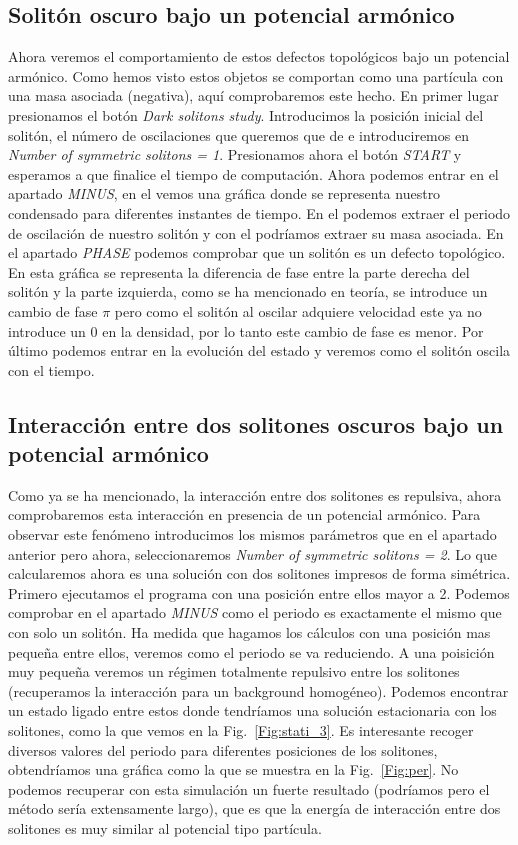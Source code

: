 \documentclass[12pt]{article}
\begin{document}
\subsection{Solit\'on oscuro bajo un potencial arm\'onico}
Ahora veremos el comportamiento de estos defectos topol\'ogicos bajo un potencial arm\'onico. Como hemos visto estos objetos se comportan como una part\'icula con una masa asociada (negativa), aqu\'i comprobaremos este hecho. En primer lugar presionamos el bot\'on \textit{Dark solitons study}. Introducimos la posici\'on inicial del solit\'on, el n\'umero de oscilaciones que queremos que de e introduciremos en \textit{Number of symmetric solitons = 1}. Presionamos ahora el bot\'on \textit{START} y esperamos a que finalice el tiempo de computaci\'on. Ahora podemos entrar en el apartado \textit{MINUS}, en el vemos una gr\'afica donde se representa nuestro condensado para diferentes instantes de tiempo. En el podemos extraer el periodo de oscilaci\'on de nuestro solit\'on y con el podr\'iamos extraer su masa asociada. En el apartado \textit{PHASE} podemos comprobar que un solit\'on es un defecto topol\'ogico. En esta gr\'afica se representa la diferencia de fase entre la parte derecha del solit\'on y la parte izquierda, como se ha mencionado en teor\'ia, se introduce un cambio de fase $\pi$ pero como el solit\'on al oscilar adquiere velocidad este ya no introduce un 0 en la densidad, por lo tanto este cambio de fase es menor. Por \'ultimo podemos entrar en la evoluci\'on del estado y veremos como el solit\'on oscila con el tiempo.

\subsection{Interacci\'on entre dos solitones oscuros bajo un potencial arm\'onico}
 Como ya se ha mencionado, la interacci\'on entre dos solitones es repulsiva, ahora comprobaremos esta interacci\'on en presencia de un potencial arm\'onico. Para observar este fen\'omeno introducimos los mismos par\'ametros que en el apartado anterior pero ahora, seleccionaremos \textit{Number of symmetric solitons = 2}. Lo que calcularemos ahora es una soluci\'on con dos solitones impresos de forma sim\'etrica. Primero ejecutamos el programa con una posici\'on entre ellos mayor a 2. Podemos comprobar en el apartado \textit{MINUS} como el periodo es exactamente el mismo que con solo un solit\'on. Ha medida que hagamos los c\'alculos con una posici\'on mas pequeña entre ellos, veremos como el periodo se va reduciendo. A una poisici\'on muy pequeña veremos un r\'egimen totalmente repulsivo entre los solitones (recuperamos la interacci\'on para un background homogéneo). Podemos encontrar un estado ligado entre estos donde tendríamos una soluci\'on estacionaria con los solitones, como la que vemos en la Fig.~\ref{Fig:stati_3}. Es interesante recoger diversos valores del periodo para diferentes posiciones de los solitones, obtendr\'iamos una gr\'afica como la que se muestra en la Fig.~\ref{Fig:per}. No podemos recuperar con esta simulaci\'on un fuerte resultado (podr\'iamos pero el m\'etodo ser\'ia extensamente largo), que es que la energ\'ia de interacci\'on entre dos solitones es muy similar al potencial tipo part\'icula.
 
\end{document}
